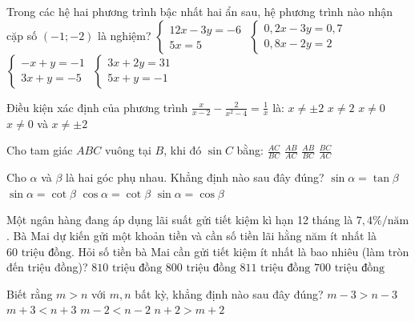 \documentclass[12pt,a4paper]{article}
\begin{document}
\begin{ex}
Trong các hệ hai phương trình bậc nhất hai ẩn sau, hệ phương trình nào nhận cặp số $(-1; -2)$ là nghiệm?
\choice
{$\begin{cases} 12x - 3y = -6 \\ 5x = 5 \end{cases}$}
{$\begin{cases} 0{,}2x - 3y = 0{,}7 \\ 0{,}8x - 2y = 2 \end{cases}$}
{\True $\begin{cases} -x + y = -1 \\ 3x + y = -5 \end{cases}$}
{$\begin{cases} 3x + 2y = 31 \\ 5x + y = -1 \end{cases}$}
\end{ex}

\begin{ex}
Điều kiện xác định của phương trình $\frac{x}{x-2} - \frac{2}{x^2-4} = \frac{1}{x}$ là:
\choice
{$x \neq \pm 2$}
{$x \neq 2$}
{$x \neq 0$}
{\True $x \neq 0$ và $x \neq \pm 2$}
\end{ex}

\begin{ex}
Cho tam giác $ABC$ vuông tại $B$, khi đó $\sin C$ bằng:
\choice
{$\frac{AC}{BC}$}
{\True $\frac{AB}{AC}$}
{$\frac{AB}{BC}$}
{$\frac{BC}{AC}$}
\end{ex}

\begin{ex}
Cho $\alpha$ và $\beta$ là hai góc phụ nhau. Khẳng định nào sau đây đúng?
\choice
{$\sin \alpha = \tan \beta$}
{$\sin \alpha = \cot \beta$}
{$\cos \alpha = \cot \beta$}
{\True $\sin \alpha = \cos \beta$}
\end{ex}

\begin{ex}
Một ngân hàng đang áp dụng lãi suất gửi tiết kiệm kì hạn 12 tháng là $7{,}4\%/\text{năm}$. Bà Mai dự kiến gửi một khoản tiền và cần số tiền lãi hằng năm ít nhất là $60\text{ triệu đồng}$. Hỏi số tiền bà Mai cần gửi tiết kiệm ít nhất là bao nhiêu (làm tròn đến triệu đồng)?
\choice
{$810\text{ triệu đồng}$}
{$800\text{ triệu đồng}$}
{\True $811\text{ triệu đồng}$}
{$700\text{ triệu đồng}$}
\end{ex}

\begin{ex}
Biết rằng $m > n$ với $m, n$ bất kỳ, khẳng định nào sau đây đúng?
\choice
{\True $m - 3 > n - 3$}
{$m + 3 < n + 3$}
{$m - 2 < n - 2$}
{$n + 2 > m + 2$}
\end{ex}
\end{document}
